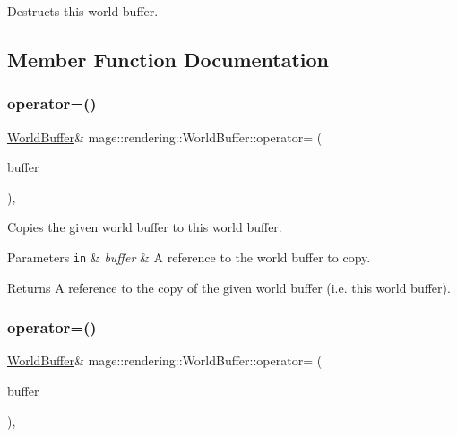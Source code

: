 Destructs this world buffer. 

\subsection{Member Function Documentation}
\hypertarget{structmage_1_1rendering_1_1_world_buffer_a0a776f3c84577f8530cf5932274cd8c9}{}\label{structmage_1_1rendering_1_1_world_buffer_a0a776f3c84577f8530cf5932274cd8c9} 
\subsubsection{\texorpdfstring{operator=()}{operator=()}\hspace{0.1cm}{\footnotesize\ttfamily [1/2]}}
{\footnotesize\ttfamily \hyperlink{structmage_1_1rendering_1_1_world_buffer}{World\+Buffer}\& mage\+::rendering\+::\+World\+Buffer\+::operator= (\begin{DoxyParamCaption}\item[{const \hyperlink{structmage_1_1rendering_1_1_world_buffer}{World\+Buffer} \&}]{buffer }\end{DoxyParamCaption})\hspace{0.3cm}{\ttfamily [default]}, {\ttfamily [noexcept]}}

Copies the given world buffer to this world buffer.


\begin{DoxyParams}[1]{Parameters}
\mbox{\tt in}  & {\em buffer} & A reference to the world buffer to copy. \\
\hline
\end{DoxyParams}
\begin{DoxyReturn}{Returns}
A reference to the copy of the given world buffer (i.\+e. this world buffer). 
\end{DoxyReturn}
\hypertarget{structmage_1_1rendering_1_1_world_buffer_a3fcc219d1410d858cc3b15f1cac5da9a}{}\label{structmage_1_1rendering_1_1_world_buffer_a3fcc219d1410d858cc3b15f1cac5da9a} 
\subsubsection{\texorpdfstring{operator=()}{operator=()}\hspace{0.1cm}{\footnotesize\ttfamily [2/2]}}
{\footnotesize\ttfamily \hyperlink{structmage_1_1rendering_1_1_world_buffer}{World\+Buffer}\& mage\+::rendering\+::\+World\+Buffer\+::operator= (\begin{DoxyParamCaption}\item[{\hyperlink{structmage_1_1rendering_1_1_world_buffer}{World\+Buffer} \&\&}]{buffer }\end{DoxyParamCaption})\hspace{0.3cm}{\ttfamily [default]}, {\ttfamily [noexcept]}}

